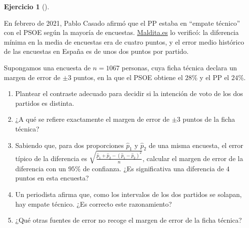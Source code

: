 \documentclass[
  spanish,
  a4paper,
]{scrreport}
\theoremstyle{definition}
\newtheorem{exercise}{Ejercicio}[chapter]
\theoremstyle{remark}
\begin{document}
\begin{exercise}[]\protect\hypertarget{exr-interpretacion-empate-tecnico}{}\label{exr-interpretacion-empate-tecnico}

En febrero de 2021, Pablo Casado afirmó que el PP estaba en ``empate
técnico'' con el PSOE según la mayoría de encuestas.
\href{https://maldita.es/malditodato/20210220/falso-casado-pp-psoe-empate-tecnico-encuestas/}{Maldita.es}
lo verificó: la diferencia mínima en la media de encuestas era de cuatro
puntos, y el error medio histórico de las encuestas en España es de unos
dos puntos por partido.

Supongamos una encuesta de \(n=1067\) personas, cuya ficha técnica
declara un margen de error de \(\pm 3\) puntos, en la que el PSOE
obtiene el \(28\)\% y el PP el \(24\)\%.

\begin{enumerate}
\def\labelenumi{\alph{enumi}.}
\item
  Plantear el contraste adecuado para decidir si la intención de voto de
  los dos partidos es distinta.
\item
  ¿A qué se refiere exactamente el margen de error de \(\pm 3\) puntos
  de la ficha técnica?
\item
  Sabiendo que, para dos proporciones \(\hat p_1\) y \(\hat p_2\) de una
  misma encuesta, el error típico de la diferencia es
  \(\sqrt{\frac{\hat p_1+\hat p_2-(\hat p_1-\hat p_2)^2}{n}}\), calcular
  el margen de error de la diferencia con un \(95\)\% de confianza. ¿Es
  significativa una diferencia de \(4\) puntos en esta encuesta?
\item
  Un periodista afirma que, como los intervalos de los dos partidos se
  solapan, hay empate técnico. ¿Es correcto este razonamiento?
\item
  ¿Qué otras fuentes de error no recoge el margen de error de la ficha
  técnica?
\end{enumerate}

\end{exercise}
\end{document}
